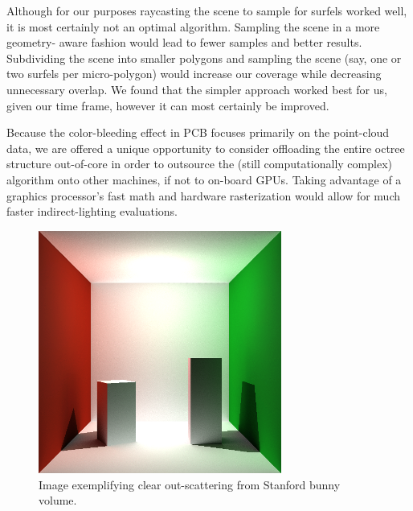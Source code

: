 \documentclass[12pt]{ucthesis}
\begin{document}
\vspace{5mm}

Although for our purposes raycasting the scene to sample for surfels worked well, it is most certainly not an optimal algorithm.  Sampling the scene in a more geometry- aware fashion would lead to fewer samples and better results.  Subdividing the scene into smaller polygons and sampling the scene (say, one or two surfels per micro-polygon) would increase our coverage while decreasing unnecessary overlap.  We found that the simpler approach worked best for us, given our time frame, however it can most certainly be improved.

\vspace{5mm}

Because the color-bleeding effect in PCB focuses primarily on the point-cloud data, we are offered a unique opportunity to consider offloading the entire octree structure out-of-core in order to outsource the (still computationally complex) algorithm onto other machines, if not to on-board GPUs.  Taking advantage of a graphics processor's fast math and hardware rasterization would allow for much faster indirect-lighting evaluations.


\clearpage







\begin{figure}[h!]
    \centering
    \includegraphics[width=80mm]{img/indirect_box_high.png}
    \caption{Image exemplifying clear out-scattering from Stanford bunny volume.}
\end{figure}
\end{document}
